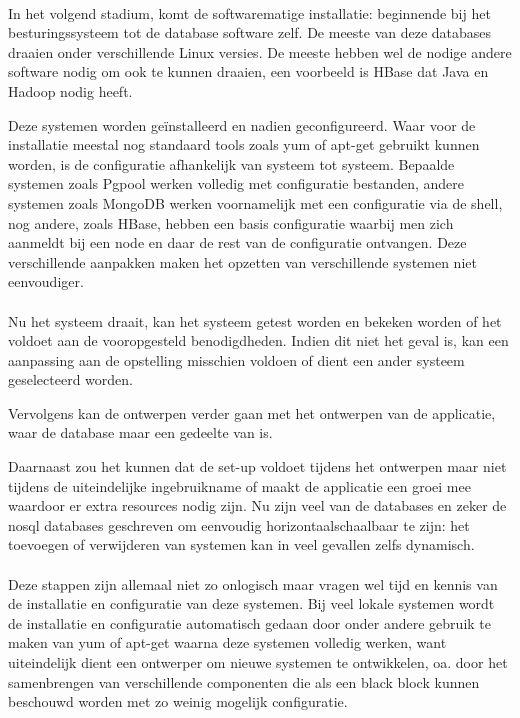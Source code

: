 \documentclass{book}
\begin{document}
\paragraph{} In het volgend stadium, komt de softwarematige installatie: beginnende bij het besturingssysteem tot de database software zelf. De meeste van deze databases draaien onder verschillende Linux versies. De meeste hebben wel de nodige andere software nodig om ook te kunnen draaien, een voorbeeld is HBase dat Java en Hadoop nodig heeft. 

Deze systemen worden geïnstalleerd en nadien geconfigureerd. Waar voor de installatie meestal nog standaard tools zoals \gls{yum} of \gls{apt-get} gebruikt kunnen worden, is de configuratie afhankelijk van systeem tot systeem. Bepaalde systemen zoals Pgpool werken volledig met configuratie bestanden, andere systemen zoals MongoDB werken voornamelijk met een configuratie via de shell, nog andere, zoals HBase, hebben een basis configuratie waarbij men zich aanmeldt bij een node en daar de rest van de configuratie ontvangen. Deze verschillende aanpakken maken het opzetten van verschillende systemen niet eenvoudiger.

\paragraph{} Nu het systeem draait, kan het systeem getest worden en bekeken worden of het voldoet aan de vooropgesteld benodigdheden. Indien dit niet het geval is, kan een aanpassing aan de opstelling misschien voldoen of dient een ander systeem geselecteerd worden. 

Vervolgens kan de ontwerpen verder gaan met het ontwerpen van de applicatie, waar de database maar een gedeelte van is. 

Daarnaast zou het kunnen dat de set-up voldoet tijdens het ontwerpen maar niet tijdens de uiteindelijke ingebruikname of maakt de applicatie een groei mee waardoor er extra resources nodig zijn. Nu zijn veel van de databases en zeker de \gls{nosql} databases geschreven om eenvoudig \gls{horizontaalschaalbaar} te zijn: het toevoegen of verwijderen van systemen kan in veel gevallen zelfs dynamisch. 

\paragraph{} Deze stappen zijn allemaal niet zo onlogisch maar vragen wel tijd en kennis van de installatie en configuratie van deze systemen. Bij veel lokale systemen wordt de installatie en configuratie automatisch gedaan door onder andere gebruik te maken van \gls{yum} of \gls{apt-get} waarna deze systemen volledig werken, want uiteindelijk dient een ontwerper om nieuwe systemen te ontwikkelen, oa. door het samenbrengen van verschillende componenten die als een black block kunnen beschouwd worden met zo weinig mogelijk configuratie. 
\end{document}
